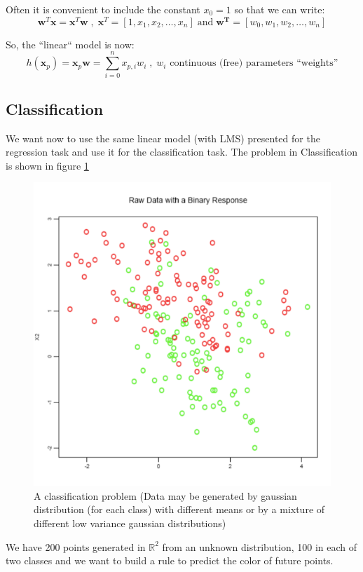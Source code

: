 \documentclass[../main.tex]{subfiles}
\begin{document}
Often it is convenient to include the constant $x_0 = 1$ so that we can write:
$$ \mathbf{w}^T\mathbf{x} = \mathbf{x}^T\mathbf{w} \;,\; \mathbf{x}^T = [1, x_1, x_2, \dots, x_n] \;\text{and}\; \mathbf{w^T} = [w_0, w_1, w_2, \dots, w_n]$$

So, the “linear“ model is now: 
$$ h(\mathbf{x}_p) = \mathbf{x}_p\mathbf{w} = \sum_{i = 0}^{n} x_{p,i}w_i \;, \; \text{$w_i$ continuous (free) parameters “weights”}$$

\subsection{Classification}
We want now to use the same linear model (with LMS) presented for the regression task and use it for the classification task. The problem in Classification is shown in figure \ref{fig:2_classification_example_problem}

\begin{figure}[H]
    \centering
    \includegraphics[scale = 0.3]{lectures/2_linear_model/2_classification_example_problem.png}
    \caption{A classification problem (Data may be generated by gaussian distribution (for each class) with different means
or by a mixture of different low variance gaussian distributions)}
    \label{fig:2_classification_example_problem}
\end{figure}
We have 200 points generated in $\mathbb{R}^2$ from an unknown distribution, 100 in each of
two classes and we want to build a rule to predict the color of future points.\\
\end{document}
